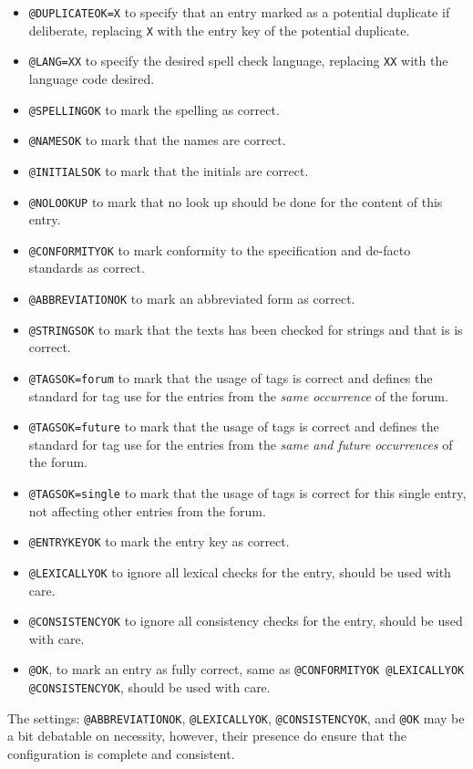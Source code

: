 \begin{itemize}
\item \texttt{@DUPLICATEOK=X} to specify that an entry marked as a
  potential duplicate if deliberate, replacing \texttt{X} with the
  entry key of the potential duplicate.
\item \texttt{@LANG=XX} to specify the desired spell check language,
  replacing \texttt{XX} with the language code desired.
\item \texttt{@SPELLINGOK} to mark the spelling as correct.
\item \texttt{@NAMESOK} to mark that the names are correct.
\item \texttt{@INITIALSOK} to mark that the initials are correct.
\item \texttt{@NOLOOKUP} to mark that no look up should be done for
  the content of this entry.
\item \texttt{@CONFORMITYOK} to mark conformity to the specification
  and de-facto standards as correct.
\item \texttt{@ABBREVIATIONOK} to mark an abbreviated form as correct.
\item \texttt{@STRINGSOK} to mark that the texts has been checked for
  strings and that is is correct.
\item \texttt{@TAGSOK=forum} to mark that the usage of tags is correct and
  defines the standard for tag use for the entries from the \emph{same
  occurrence} of the forum.
\item \texttt{@TAGSOK=future} to mark that the usage of tags is
  correct and defines the standard for tag use for the entries from
  the \emph{same and future occurrences} of the forum.
\item \texttt{@TAGSOK=single} to mark that the usage of tags is
  correct for this single entry, not affecting other entries from the
  forum.
\item \texttt{@ENTRYKEYOK} to mark the entry key as correct.
\item \texttt{@LEXICALLYOK} to ignore all lexical checks for the
  entry, should be used with care.
\item \texttt{@CONSISTENCYOK} to ignore all consistency checks for the
  entry, should be used with care.
\item \texttt{@OK}, to mark an entry as fully correct, same as
  \texttt{@CONFORMITYOK @LEXICALLYOK @CONSISTENCYOK}, should be used
  with care.
\end{itemize}

The settings: \texttt{@ABBREVIATIONOK}, \texttt{@LEXICALLYOK},
\texttt{@CONSISTENCYOK}, and \texttt{@OK} may be a bit debatable on
necessity, however, their presence do ensure that the configuration is
complete and consistent.


